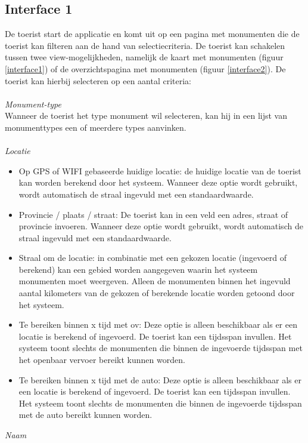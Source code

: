 \documentclass[a4paper,10pt]{article}
\begin{document}
			\subsection{Interface 1}
			De toerist start de applicatie en komt uit op een pagina met monumenten die de toerist kan filteren aan de hand van selectiecriteria. De toerist kan schakelen tussen twee view-mogelijkheden, namelijk de kaart met monumenten (figuur \ref{interface1}) of de overzichtspagina met monumenten (figuur \ref{interface2}). De toerist kan hierbij selecteren op een aantal criteria:\\
			\\
			\textit{Monument-type}\\
			Wanneer de toerist het type monument wil selecteren, kan hij in een lijst van monumenttypes een of meerdere types aanvinken.\\
			\\
			\textit{Locatie}
			\begin{itemize}
				\item Op GPS of WIFI gebaseerde huidige locatie: de huidige locatie van de toerist kan worden berekend door het systeem. Wanneer deze optie wordt gebruikt, wordt automatisch de straal ingevuld met een standaardwaarde. 
				\item Provincie / plaats / straat: De toerist kan in een veld een adres, straat of provincie invoeren. Wanneer deze optie wordt gebruikt, wordt automatisch de straal ingevuld met een standaardwaarde.
				\item Straal om de locatie: in combinatie met een gekozen locatie (ingevoerd of berekend) kan een gebied worden aangegeven waarin het systeem monumenten moet weergeven. Alleen de monumenten binnen het ingevuld aantal kilometers van de gekozen of berekende locatie worden getoond door het systeem.
				\item Te bereiken binnen x tijd met ov: Deze optie is alleen beschikbaar als er een locatie is berekend of ingevoerd. De toerist kan een tijdsspan invullen. Het systeem toont slechts de monumenten die binnen de ingevoerde tijdsspan met het openbaar vervoer bereikt kunnen worden.
				\item Te bereiken binnen x tijd met de auto: Deze optie is alleen beschikbaar als er een locatie is berekend of ingevoerd. De toerist kan een tijdsspan invullen. Het systeem toont slechts de monumenten die binnen de ingevoerde tijdsspan met de auto bereikt kunnen worden.
			\end{itemize}
			\textit{Naam}\\
\end{document}
